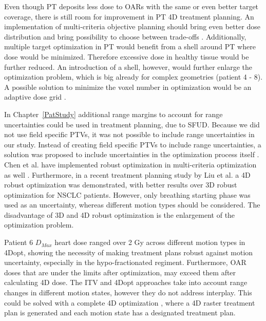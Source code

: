 \documentclass[type=dr, dr=rernat, accentcolor=tud7b,colorbacktitle, bigchapter, openright, twoside, 12pt ]{tudthesis}
\begin{document}
Even though PT deposits less dose to OARs with the same or even better target coverage, there is still room for improvement in PT 4D treatment planning. 
An implementation of multi-criteria objective planning should bring even better dose distribution and bring possibility to choose between trade-offs \cite{Breedveld2007, Chen2010}. 
Additionally, multiple target optimization in PT would benefit from a shell around PT where dose would be minimized. Therefore excessive dose
in healthy tissue would be further reduced. An introduction of a shell, however, would further enlarge the optimization problem, which is big already for complex geometries (patient 4 - 8). 
A possible solution to minimize the voxel number in optimization would be an adaptive dose grid \cite{Prall2016a}.

In Chapter~\ref{PatStudy} additional range margins to account for range uncertainties could be used in treatment planning, due to SFUD. 
Because we did not use field specific PTVs, it was not possible to include range uncertainties in our study.
Instead of creating field specific PTVs to include range uncertainties, a solution was proposed to include uncertainties in the optimization process itself \cite{Pflugfelder2008, Unkelbach2009, Fredriksson2011, Chen2012}.
Chen et al. have implemented robust optimization in multi-criteria optimization as well \cite{Chen2012}. Furthermore, in a recent treatment planning study by Liu et al. \cite{Liu2016}
a 4D robust optimization was demonstrated, with better results over 3D robust optimization for NSCLC patients. However, only breathing starting phase was used as an uncertainty,
whereas different motion types should be considered. The disadvantage of 3D and 4D robust optimization is the enlargement of the optimization problem.

Patient 6 $D_{Max}$ heart dose ranged over 2 Gy across different motion types in 4Dopt, showing the necessity of making treatment plans robust against motion uncertainty, 
especially in the hypo-fractionated regiment. Furthermore, OAR doses that are under the limits after optimization, may exceed them after calculating 4D dose. 
The ITV and 4Dopt approaches take into account range changes in different motion states, however they do not address interplay. 
This could be solved with a complete 4D optimization \cite{Graeff2013}, where a 4D raster treatment plan is 
generated and each motion state has a designated treatment plan. 

\end{document}
